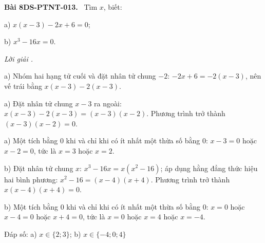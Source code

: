 \documentclass[12pt,a4paper]{article}
\newenvironment{problem}[1][]{\par\medskip\noindent\textbf{Bài #1.}\ }{\par}
\newenvironment{solution}[1][]{\par\noindent\textit{Lời giải #1.}\par}{\par}
\begin{document}
\begin{problem}[8DS-PTNT-013]
Tìm $x$, biết:

a) $x(x - 3) - 2x + 6 = 0$;

b) $x^3 - 16x = 0$.

\begin{solution}
a) Nhóm hai hạng tử cuối và đặt nhân tử chung $-2$: $-2x + 6 = -2(x - 3)$, nên vế trái bằng $x(x - 3) - 2(x - 3)$.

a) Đặt nhân tử chung $x - 3$ ra ngoài: $x(x - 3) - 2(x - 3) = (x - 3)(x - 2)$. Phương trình trở thành $(x - 3)(x - 2) = 0$.

a) Một tích bằng $0$ khi và chỉ khi có ít nhất một thừa số bằng $0$: $x - 3 = 0$ hoặc $x - 2 = 0$, tức là $x = 3$ hoặc $x = 2$.

b) Đặt nhân tử chung $x$: $x^3 - 16x = x(x^2 - 16)$; áp dụng hằng đẳng thức hiệu hai bình phương: $x^2 - 16 = (x - 4)(x + 4)$. Phương trình trở thành $x(x - 4)(x + 4) = 0$.

b) Một tích bằng $0$ khi và chỉ khi có ít nhất một thừa số bằng $0$: $x = 0$ hoặc $x - 4 = 0$ hoặc $x + 4 = 0$, tức là $x = 0$ hoặc $x = 4$ hoặc $x = -4$.

Đáp số: a) $\boxed{x \in \{2; 3\}}$; b) $\boxed{x \in \{-4; 0; 4\}}$
\end{solution}
\end{problem}
\end{document}
